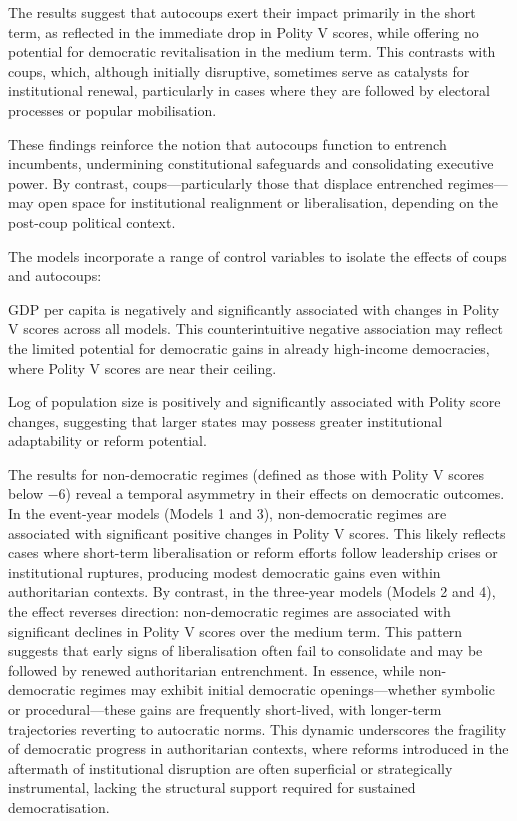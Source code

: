 \documentclass[
  12pt,
]{report}
\begin{document}
The results suggest that autocoups exert their impact primarily in the
short term, as reflected in the immediate drop in Polity V scores, while
offering no potential for democratic revitalisation in the medium term.
This contrasts with coups, which, although initially disruptive,
sometimes serve as catalysts for institutional renewal, particularly in
cases where they are followed by electoral processes or popular
mobilisation.

These findings reinforce the notion that autocoups function to entrench
incumbents, undermining constitutional safeguards and consolidating
executive power. By contrast, coups---particularly those that displace
entrenched regimes---may open space for institutional realignment or
liberalisation, depending on the post-coup political context.

The models incorporate a range of control variables to isolate the
effects of coups and autocoups:

GDP per capita is negatively and significantly associated with changes
in Polity V scores across all models. This counterintuitive negative
association may reflect the limited potential for democratic gains in
already high-income democracies, where Polity V scores are near their
ceiling.

Log of population size is positively and significantly associated with
Polity score changes, suggesting that larger states may possess greater
institutional adaptability or reform potential.

The results for non-democratic regimes (defined as those with Polity V
scores below −6) reveal a temporal asymmetry in their effects on
democratic outcomes. In the event-year models (Models 1 and 3),
non-democratic regimes are associated with significant positive changes
in Polity V scores. This likely reflects cases where short-term
liberalisation or reform efforts follow leadership crises or
institutional ruptures, producing modest democratic gains even within
authoritarian contexts. By contrast, in the three-year models (Models 2
and 4), the effect reverses direction: non-democratic regimes are
associated with significant declines in Polity V scores over the medium
term. This pattern suggests that early signs of liberalisation often
fail to consolidate and may be followed by renewed authoritarian
entrenchment. In essence, while non-democratic regimes may exhibit
initial democratic openings---whether symbolic or procedural---these
gains are frequently short-lived, with longer-term trajectories
reverting to autocratic norms. This dynamic underscores the fragility of
democratic progress in authoritarian contexts, where reforms introduced
in the aftermath of institutional disruption are often superficial or
strategically instrumental, lacking the structural support required for
sustained democratisation.
\end{document}
